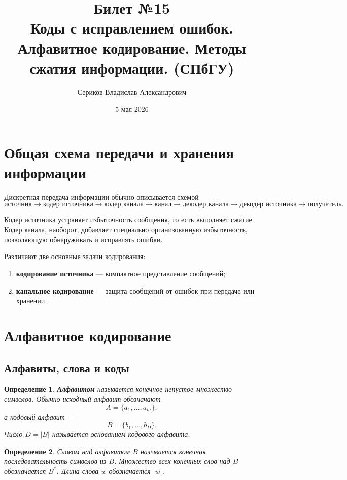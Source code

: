 \documentclass[12pt,a4paper]{article}
\title{Билет №15 \\ \small Коды с исправлением ошибок. Алфавитное кодирование. Методы сжатия информации.  (СПбГУ)}
\author{Сериков Владислав Александрович}
\date{5 мая 2026}
\newtheorem{definition}{Определение}[section]
\begin{document}
\maketitle
\tableofcontents
\newpage

\section{Общая схема передачи и хранения информации}

Дискретная передача информации обычно описывается схемой
\[
    \text{источник}
    \longrightarrow
    \text{кодер источника}
    \longrightarrow
    \text{кодер канала}
    \longrightarrow
    \text{канал}
    \longrightarrow
    \text{декодер канала}
    \longrightarrow
    \text{декодер источника}
    \longrightarrow
    \text{получатель}.
\]

Кодер источника устраняет избыточность сообщения, то есть выполняет сжатие.
Кодер канала, наоборот, добавляет специально организованную избыточность, позволяющую обнаруживать и исправлять ошибки.

Различают две основные задачи кодирования:
\begin{enumerate}
    \item \textbf{кодирование источника} --- компактное представление сообщений;
    \item \textbf{канальное кодирование} --- защита сообщений от ошибок при передаче или хранении.
\end{enumerate}

\section{Алфавитное кодирование}

\subsection{Алфавиты, слова и коды}

\begin{definition}
\textbf{Алфавитом} называется конечное непустое множество символов. Обычно исходный алфавит обозначают
\[
    A = \{a_1,\dots,a_m\},
\]
а кодовый алфавит ---
\[
    B = \{b_1,\dots,b_D\}.
\]
Число $D = |B|$ называется основанием кодового алфавита.
\end{definition}

\begin{definition}
Словом над алфавитом $B$ называется конечная последовательность символов из $B$.
Множество всех конечных слов над $B$ обозначается $B^*$.
Длина слова $w$ обозначается $|w|$.
\end{definition}
\end{document}
